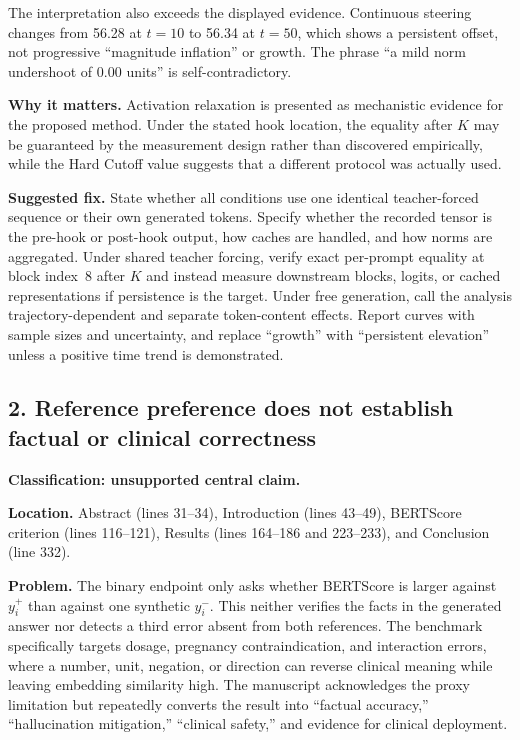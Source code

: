 \documentclass[11pt]{article}
\newcommand{\status}[1]{\textbf{#1}}
\begin{document}
The interpretation also exceeds the displayed evidence.  Continuous steering changes from 56.28 at $t=10$ to 56.34 at $t=50$, which shows a persistent offset, not progressive ``magnitude inflation'' or growth.  The phrase ``a mild norm undershoot of $0.00$ units'' is self-contradictory.

\status{Why it matters.} Activation relaxation is presented as mechanistic evidence for the proposed method.  Under the stated hook location, the equality after $K$ may be guaranteed by the measurement design rather than discovered empirically, while the Hard Cutoff value suggests that a different protocol was actually used.

\status{Suggested fix.} State whether all conditions use one identical teacher-forced sequence or their own generated tokens.  Specify whether the recorded tensor is the pre-hook or post-hook output, how caches are handled, and how norms are aggregated.  Under shared teacher forcing, verify exact per-prompt equality at block index~8 after $K$ and instead measure downstream blocks, logits, or cached representations if persistence is the target.  Under free generation, call the analysis trajectory-dependent and separate token-content effects.  Report curves with sample sizes and uncertainty, and replace ``growth'' with ``persistent elevation'' unless a positive time trend is demonstrated.

\subsection*{2. Reference preference does not establish factual or clinical correctness}

\status{Classification: unsupported central claim.}

\status{Location.} Abstract (lines 31--34), Introduction (lines 43--49), BERTScore criterion (lines 116--121), Results (lines 164--186 and 223--233), and Conclusion (line 332).

\status{Problem.} The binary endpoint only asks whether BERTScore is larger against $y_i^+$ than against one synthetic $y_i^-$.  This neither verifies the facts in the generated answer nor detects a third error absent from both references.  The benchmark specifically targets dosage, pregnancy contraindication, and interaction errors, where a number, unit, negation, or direction can reverse clinical meaning while leaving embedding similarity high.  The manuscript acknowledges the proxy limitation but repeatedly converts the result into ``factual accuracy,'' ``hallucination mitigation,'' ``clinical safety,'' and evidence for clinical deployment.
\end{document}
